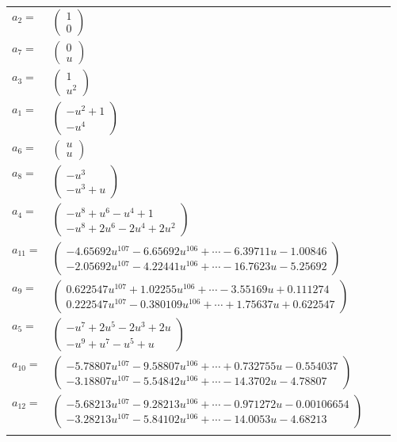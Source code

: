 \documentclass[1p]{elsarticle_modified}
\theoremstyle{definition}
\begin{document}
\begin{tabular}{m{7pt} m{180pt} m{7pt} m{180pt} }
\flushright $a_{2}=$&$\begin{pmatrix}1\\0\end{pmatrix}$ \\
\flushright $a_{7}=$&$\begin{pmatrix}0\\u\end{pmatrix}$ \\
\flushright $a_{3}=$&$\begin{pmatrix}1\\u^2\end{pmatrix}$ \\
\flushright $a_{1}=$&$\begin{pmatrix}- u^2+1\\- u^4\end{pmatrix}$ \\
\flushright $a_{6}=$&$\begin{pmatrix}u\\u\end{pmatrix}$ \\
\flushright $a_{8}=$&$\begin{pmatrix}- u^3\\- u^3+u\end{pmatrix}$ \\
\flushright $a_{4}=$&$\begin{pmatrix}- u^8+u^6- u^4+1\\- u^8+2 u^6-2 u^4+2 u^2\end{pmatrix}$ \\
\flushright $a_{11}=$&$\begin{pmatrix}-4.65692 u^{107}-6.65692 u^{106}+\cdots-6.39711 u-1.00846\\-2.05692 u^{107}-4.22441 u^{106}+\cdots-16.7623 u-5.25692\end{pmatrix}$ \\
\flushright $a_{9}=$&$\begin{pmatrix}0.622547 u^{107}+1.02255 u^{106}+\cdots-3.55169 u+0.111274\\0.222547 u^{107}-0.380109 u^{106}+\cdots+1.75637 u+0.622547\end{pmatrix}$ \\
\flushright $a_{5}=$&$\begin{pmatrix}- u^7+2 u^5-2 u^3+2 u\\- u^9+u^7- u^5+u\end{pmatrix}$ \\
\flushright $a_{10}=$&$\begin{pmatrix}-5.78807 u^{107}-9.58807 u^{106}+\cdots+0.732755 u-0.554037\\-3.18807 u^{107}-5.54842 u^{106}+\cdots-14.3702 u-4.78807\end{pmatrix}$ \\
\flushright $a_{12}=$&$\begin{pmatrix}-5.68213 u^{107}-9.28213 u^{106}+\cdots-0.971272 u-0.00106654\\-3.28213 u^{107}-5.84102 u^{106}+\cdots-14.0053 u-4.68213\end{pmatrix}$\\&\end{tabular}
\end{document}
